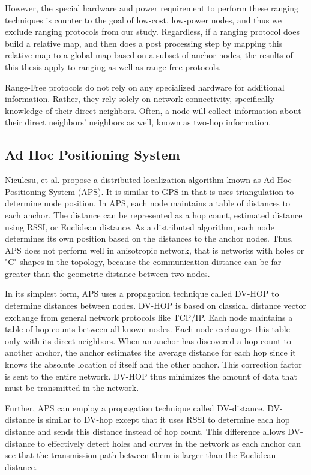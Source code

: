 However, the special hardware and power requirement to perform these ranging techniques is counter to the goal of low-cost, low-power nodes, and thus we exclude ranging protocols from our study.  Regardless, if a ranging protocol does build a relative map, and then does a post processing step by mapping this relative map to a global map based on a subset of anchor nodes, the results of this thesis apply to ranging as well as range-free protocols.

Range-Free protocols do not rely on any specialized hardware for additional information.  Rather, they rely solely on network connectivity, specifically knowledge of their direct neighbors.  Often, a node will collect information about their direct neighbors' neighbors as well, known as two-hop information.  

\subsection{Ad Hoc Positioning System}
Niculesu, et al. propose a distributed localization algorithm known as Ad Hoc Positioning System (APS)\cite{APS}.  It is similar to GPS in that is uses triangulation to determine node position.  In APS, each node maintains a table of distances to each anchor.  The distance can be represented as a hop count, estimated distance using RSSI, or Euclidean distance.  As a distributed algorithm, each node determines its own position based on the distances to the anchor nodes.  Thus, APS does not perform well in anisotropic network, that is networks with holes or "C" shapes in the topology, because the communication distance can be far greater than the geometric distance between two nodes.

In its simplest form, APS uses a propagation technique called DV-HOP to determine distances between nodes.  DV-HOP is based on classical distance vector exchange from general network protocols like TCP/IP.  Each node maintains a table of hop counts between all known nodes.  Each node exchanges this table only with its direct neighbors.  When an anchor has discovered a hop count to another anchor, the anchor estimates the average distance for each hop since it knows the absolute location of itself and the other anchor. 
This correction factor is sent to the entire network.  DV-HOP thus minimizes the amount of data that must be transmitted in the network.  

Further, APS can employ a propagation technique called DV-distance.  DV-distance is similar to DV-hop except that it uses RSSI to determine each hop distance and sends this distance instead of hop count.  This difference allows DV-distance to effectively detect holes and curves in the network as each anchor can see that the transmission path between them is larger than the Euclidean distance.


